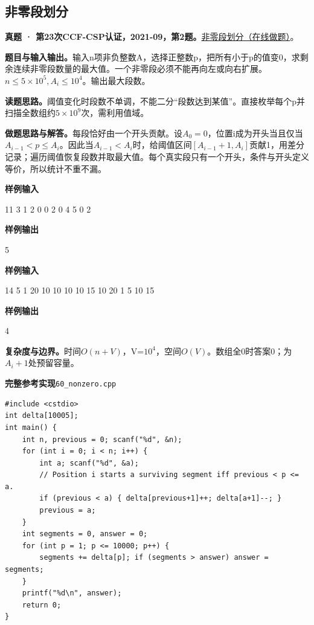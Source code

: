 \documentclass[UTF8,11pt,a4paper,fontset=none]{ctexart}
\begin{document}
\subsection{非零段划分}
\textbf{真题 · 第23次CCF-CSP认证，2021-09，第2题。}\href{https://www.acwing.com/problem/content/4010/}{非零段划分（在线做题）}。

\noindent\textbf{题目与输入输出。}输入n项非负整数A，选择正整数p，把所有小于p的值变0，求剩余连续非零段数量的最大值。一个非零段必须不能再向左或向右扩展。$n\le5\times10^5,A_i\le10^4$。输出最大段数。

\noindent\textbf{读题思路。}阈值变化时段数不单调，不能二分“段数达到某值”。直接枚举每个p并扫描全数组约$5\times10^9$次，需利用值域。

\noindent\textbf{做题思路与解答。}每段恰好由一个开头贡献。设$A_0=0$，位置i成为开头当且仅当$A_{i-1}<p\le A_i$。因此当$A_{i-1}<A_i$时，给阈值区间$[A_{i-1}+1,A_i]$贡献1，用差分记录；遍历阈值恢复段数并取最大值。每个真实段只有一个开头，条件与开头定义等价，所以统计不重不漏。
\begin{tcolorbox}[samplebox,title={输入输出样例}]
\textbf{样例输入}
\begin{Sample}
11
3 1 2 0 0 2 0 4 5 0 2
\end{Sample}
\tcblower
\textbf{样例输出}
\begin{Sample}
5
\end{Sample}
\end{tcolorbox}
\begin{tcolorbox}[samplebox,title={输入输出样例}]
\textbf{样例输入}
\begin{Sample}
14
5 1 20 10 10 10 10 15 10 20 1 5 10 15
\end{Sample}
\tcblower
\textbf{样例输出}
\begin{Sample}
4
\end{Sample}
\end{tcolorbox}

\noindent\textbf{复杂度与边界。}时间$O(n+V)$，V=$10^4$，空间$O(V)$。数组全0时答案0；为$A_i+1$处预留容量。
\par\noindent\begin{minipage}{\linewidth}
\textbf{完整参考实现}\quad\texttt{60\_nonzero.cpp}
\begin{lstlisting}
#include <cstdio>
int delta[10005];
int main() {
    int n, previous = 0; scanf("%d", &n);
    for (int i = 0; i < n; i++) {
        int a; scanf("%d", &a);
        // Position i starts a surviving segment iff previous < p <= a.
        if (previous < a) { delta[previous+1]++; delta[a+1]--; }
        previous = a;
    }
    int segments = 0, answer = 0;
    for (int p = 1; p <= 10000; p++) {
        segments += delta[p]; if (segments > answer) answer = segments;
    }
    printf("%d\n", answer);
    return 0;
}
\end{lstlisting}
\end{minipage}\par
\end{document}
